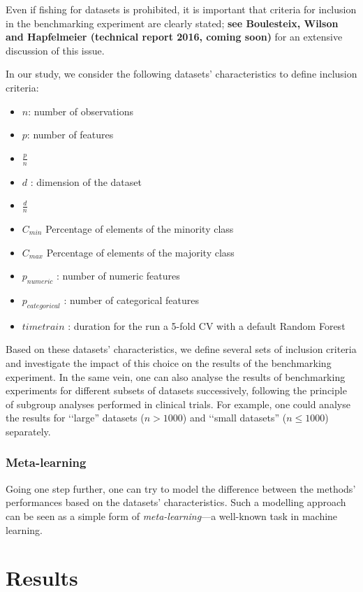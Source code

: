 \documentclass[12pt]{article}
\begin{document}
Even if fishing for datasets is prohibited, it is important that criteria for inclusion in the benchmarking experiment are clearly stated; \textbf{see Boulesteix, Wilson and Hapfelmeier (technical report 2016, coming soon)} for an extensive discussion of this issue.

In our study, we consider the following datasets' characteristics to define inclusion criteria:
\begin{itemize}
\item $n$: number of observations
\item $p$: number of features
\item	$\frac{p}{n}$ 
\item	$d$ : dimension of the dataset
\item	$\frac{d}{n}$ 
\item	$C_{min}$ Percentage of elements of the minority class
\item	$C_{max}$ Percentage of elements of the majority class
\item	$p_{numeric}$ : number of numeric features
\item	$p_{categorical}$ : number of categorical features
\item $timetrain$ : duration for the run a 5-fold CV with a default Random Forest 
\end{itemize}

Based on these datasets' characteristics, we define several sets of inclusion criteria and investigate the impact of this choice on the results of the benchmarking experiment. In the same vein, one can also analyse the results of benchmarking experiments for different subsets of datasets successively, following the principle of subgroup analyses performed in clinical trials. For example, one could analyse the results for \lq\lq large'' datasets ($n>1000$) and \lq\lq small datasets'' ($n\leq 1000$) separately.


\subsubsection{Meta-learning}
Going one step further, one can try to model the difference between the methods' performances based on the datasets' characteristics. Such a modelling approach can be seen as a simple form of {\it meta-learning}---a well-known task in machine learning.

\newpage

\section{Results}
\end{document}
